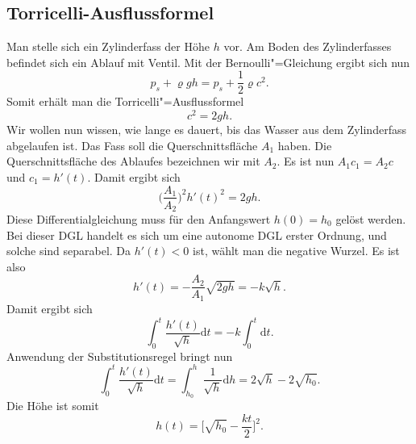 \documentclass[a4paper,10pt,fleqn,twocolumn,twoside]{scrartcl}
\begin{document}
\subsection{Torricelli-Ausflussformel}
Man stelle sich ein Zylinderfass der Höhe $h$ vor. Am Boden des
Zylinderfasses befindet sich ein Ablauf mit Ventil. Mit der
Bernoulli"=Gleichung ergibt sich nun%
\[p_s+\varrho gh = p_s+\frac{1}{2}\varrho c^2.\]
Somit erhält man die Torricelli"=Ausflussformel%
\[c^2=2gh.\]
Wir wollen nun wissen, wie lange es dauert, bis das Wasser aus dem
Zylinderfass abgelaufen ist. Das Fass soll die Querschnittsfläche $A_1$
haben. Die Querschnittsfläche des Ablaufes bezeichnen wir mit $A_2$.
Es ist nun $A_1c_1=A_2c$ und $c_1=h'(t)$. Damit ergibt sich%
\[\Big(\frac{A_1}{A_2}\Big)^2 h'(t)^2 = 2gh.\]
Diese Differentialgleichung muss für den Anfangswert $h(0)=h_0$
gelöst werden. Bei dieser DGL handelt es sich um eine autonome
DGL erster Ordnung, und solche sind separabel. Da $h'(t)<0$ ist,
wählt man die negative Wurzel. Es ist also%
\[h'(t) = -\frac{A_2}{A_1} \sqrt{2gh} = -k\sqrt{h}.\]
Damit ergibt sich
\[\int_0^t \frac{h'(t)}{\sqrt{h}} \mathrm dt
= -k\int_0^t \mathrm dt.\]
Anwendung der Substitutionsregel bringt nun%
\[\int_0^t \frac{h'(t)}{\sqrt{h}}\mathrm dt
= \int_{h_0}^h \frac{1}{\sqrt{h}}\mathrm dh=2\sqrt{h}-2\sqrt{h_0}.\]
Die Höhe ist somit
\[h(t) = \bigg[\sqrt{h_0}-\frac{kt}{2}\bigg]^2.\]
\end{document}
